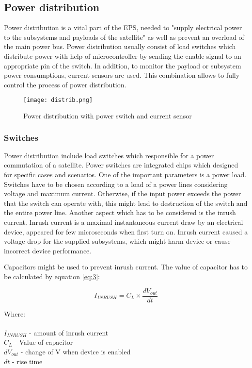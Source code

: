 \subsection{Power distribution \label{sec:tech}}

Power distribution is a vital part of the EPS, needed to \cite{21} "supply electrical power to the subsystems and payloads of the satellite" as well as prevent an overload of the main power bus. Power distribution usually consist of load switches which distribute power with help of microcontroller by sending the enable signal to an appropriate pin of the switch. In addition, to monitor the payload or subsystem power consumptions, current sensors are used. This combination allows to fully control the process of power distribution.


\begin{figure}[h]
	\centering
	\texttt{[image: distrib.png]}
	\caption{Power distribution with power switch and current sensor}
	\label{fig: EPS}
\end{figure}

\newpage

\subsubsection{Switches}
Power distribution include load switches which responsible for a power commutation of a satellite. Power switches are integrated chips which designed for specific cases and scenarios. One of the important parameters is a power load. Switches have to be chosen according to a load of a power lines considering voltage and maximum current. Otherwise, if the input power exceeds the power that the switch can operate with, this might lead to destruction of the switch and the entire power line.  Another aspect which has to be considered is the inrush current. Inrush current is a maximal instantaneous current draw by an electrical device, appeared for few microseconds when first turn on. Inrush current caused a voltage drop for the supplied subsystems, which might harm device or cause incorrect device performance.

 Capacitors might be used to prevent inrush current. The value of capacitor has to be calculated by equation \ref{eq:3}:
 
 \begin{equation}\label{eq:3}
 I_{INRUSH} = C_{L} \times \dfrac{dV_{out}}{dt}
 \end{equation}
 
 Where:\\ \\
 $I_{INRUSH}$ - amount of inrush current\\
 $C_{L}$ - Value of capacitor \\
 $dV_{out}$ - change of V when device is enabled\\
 $dt$ - rise time\\

